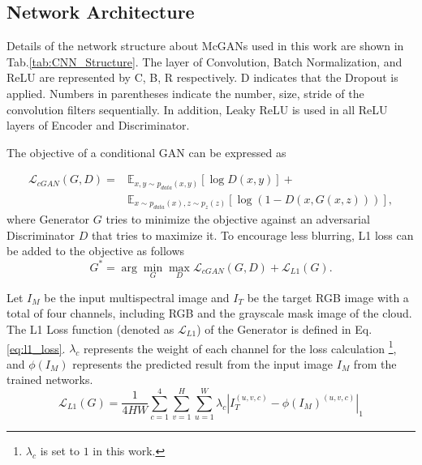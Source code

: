 \documentclass[10pt,twocolumn,letterpaper]{article}
\begin{document}
\subsection*{Network Architecture}
Details of the network structure about McGANs used in this work are shown in Tab.\ref{tab:CNN_Structure}.
The layer of Convolution, Batch Normalization, and ReLU are represented by C, B, R respectively. D indicates that the Dropout is applied.
Numbers in parentheses indicate the number, size, stride of the convolution filters sequentially. In addition, Leaky ReLU is used in all ReLU layers of Encoder and Discriminator.

The objective of a conditional GAN can be expressed as

\begin{equation}
\begin{split}
\mathcal{L}_{cGAN}(G,D)=&\mathbb{E}_{x,y\sim p_{data}(x,y)}[\log D(x,y)]+\\
&\mathbb{E}_{x\sim p_{data}(x),z\sim p_{z}(z)}[\log (1-D(x,G(x,z)))],
\end{split}
\label{eq:gan_loss}
\end{equation}
where Generator $G$ tries to minimize the objective against an adversarial Discriminator $D$ that tries to maximize it.
To encourage less blurring, L1 loss can be added to the objective as follows \cite{isola2016image}
\begin{equation}
G^* = \arg \min_{G} \max_{D} \mathcal{L}_{cGAN}(G,D) + \mathcal{L}_{L1}(G).
\label{eq:minmax}
\end{equation}

Let $I_M$ be the input multispectral image and $I_T$ be the target RGB image with a total of four channels, including RGB and the grayscale mask image of the cloud. The L1 Loss function (denoted as $\mathcal{L}_{L1}$) of the Generator is defined in Eq.\ref{eq:l1_loss}. 
$\lambda_c$ represents the weight of each channel for the loss calculation \footnote{$\lambda_c$ is set to $1$ in this work.}, and $\phi(I_M)$ represents the predicted result from the input image $I_M$ from the trained networks.
\begin{equation}
\mathcal{L}_{L1}(G)=\frac{1}{4HW}\sum_{c=1}^{4}\sum_{v=1}^{H}\sum_{u=1}^{W} \lambda_c|I_T^{(u,v,c)}-\phi(I_M)^{(u,v,c)}|_1
\label{eq:l1_loss}
\end{equation}
\end{document}
